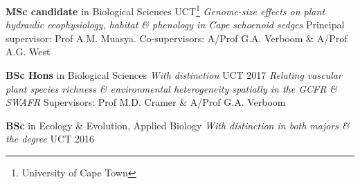 \begin{hangparas}{2em}{1}

\textbf{MSc candidate} in Biological Sciences \hfill {\small UCT\footnote{University of Cape Town}} \break %
\textit{Genome-size effects on plant hydraulic ecophysiology, habitat \&
  phenology in Cape schoenoid sedges} \break
Principal supervisor: Prof A.M. Muasya. Co-supervisors: A/Prof G.A. Verboom
  \& A/Prof A.G. West

\textbf{BSc Hons} in Biological Sciences {\small \textit{With distinction}}
                                                 \hfill {\small UCT 2017} \break
\textit{Relating vascular plant species richness \& environmental heterogeneity
  spatially in the GCFR \& SWAFR} \break
Supervisors: Prof M.D. Cramer \& A/Prof G.A. Verboom

\textbf{BSc} in Ecology \& Evolution, Applied Biology {\small \textit{With
  distinction in both majors \& the degree}}     \hfill {\small UCT 2016} \break

\end{hangparas}
